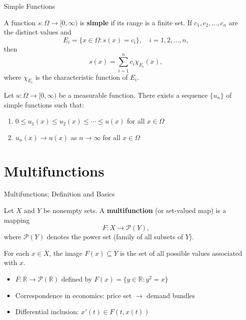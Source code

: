 \documentclass[aspectratio=169,10pt]{beamer}
\begin{document}
\begin{frame}{Simple Functions}
\begin{definition}
A function $s: \Omega \to [0, \infty)$ is \textbf{simple} if its range is a finite set. If $c_1, c_2, \ldots, c_n$ are the distinct values and
$$E_i = \{x \in \Omega: s(x) = c_i\}, \quad i = 1, 2, \ldots, n,$$
then
$$s(x) = \sum_{i=1}^{n} c_i \chi_{E_i}(x),$$
where $\chi_{E_i}$ is the characteristic function of $E_i$.
\end{definition}

\vspace{0.3cm}

\begin{theorem}
Let $u: \Omega \to [0, \infty)$ be a measurable function. There exists a sequence $\{u_n\}$ of simple functions such that:
\begin{enumerate}
    \item $0 \le u_1(x) \le u_2(x) \le \cdots \le u(x)$ for all $x \in \Omega$
    \item $u_n(x) \to u(x)$ as $n \to \infty$ for all $x \in \Omega$
\end{enumerate}
\end{theorem}
\end{frame}

\section{Multifunctions}

\begin{frame}{Multifunctions: Definition and Basics}
\begin{definition}[Multifunction]
Let $X$ and $Y$ be nonempty sets. A \textbf{multifunction} (or set-valued map) is a mapping
$$F: X \to \mathcal{P}(Y),$$
where $\mathcal{P}(Y)$ denotes the power set (family of all subsets of $Y$).

For each $x \in X$, the image $F(x) \subseteq Y$ is the set of all possible values associated with $x$.
\end{definition}

\vspace{0.3cm}

\begin{example}
\begin{itemize}
    \item $F: \mathbb{R} \to \mathcal{P}(\mathbb{R})$ defined by $F(x) = \{y \in \mathbb{R}: y^2 = x\}$
    \item Correspondence in economics: price set $\to$ demand bundles
    \item Differential inclusion: $x'(t) \in F(t, x(t))$
\end{itemize}
\end{example}
\end{frame}
\end{document}
